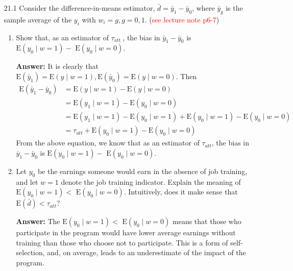 \begin{enumerate}
    \item[21.1] Consider the difference-in-means estimator, $\bar{d}=\bar{y}_{1}-\bar{y}_{0}$, where $\bar{y}_{g}$ is the sample average of the $y_{i}$ with $w_{i}=g, g=0,1$. (\textcolor{red}{see lecture note p6-7})
    \begin{enumerate}
        \item Show that, as an estimator of $\tau_{\text {att }}$, the bias in $\bar{y}_{1}-\bar{y}_{0}$ is $\mathrm{E}\left(y_{0} \mid w=1\right)-$ $\mathrm{E}\left(y_{0} \mid w=0\right)$.
        
        \textbf{Answer:} It is clearly that $\mathrm{E}(\bar{y}_1) = \mathrm{E}(y \mid w=1), \mathrm{E}(\bar{y}_0) = \mathrm{E}(y \mid w=0)$. Then
        \begin{align*}
            \mathrm{E}(\bar{y}_{1}-\bar{y}_{0}) &= \mathrm{E}(y \mid w=1) - \mathrm{E}(y \mid w=0) \\
            &= \mathrm{E}(y_1 \mid w=1) - \mathrm{E}(y_0 \mid w=0) \\
            &= \mathrm{E}(y_1 \mid w=1) - \mathrm{E}(y_0 \mid w=1) + \mathrm{E}(y_0 \mid w=1) - \mathrm{E}(y_0 \mid w=0) \\
            &= \tau_{att} + \mathrm{E}(y_0 \mid w=1) - \mathrm{E}(y_0 \mid w=0)
        \end{align*}
        From the above equation, we know that as an estimator of $\tau_{att}$, the bias in $\bar{y}_{1}-\bar{y}_{0}$ is $\mathrm{E}\left(y_{0} \mid w=1\right)-$ $\mathrm{E}\left(y_{0} \mid w=0\right)$.
        
        \item Let $y_{0}$ be the earnings someone would earn in the absence of job training, and let $w=1$ denote the job training indicator. Explain the meaning of $\mathrm{E}\left(y_{0} \mid w=1\right)<$ $\mathrm{E}\left(y_{0} \mid w=0\right)$. Intuitively, does it make sense that $\mathrm{E}(\bar{d})<\tau_{a t t}$?
        
        \textbf{Answer:} The $\mathrm{E}\left(y_{0} \mid w=1\right)<$ $\mathrm{E}\left(y_{0} \mid w=0\right)$ means that those who participate in the program would have lower average earnings without training than those who choose not to participate. This is a form of self-selection, and, on average, leads to an underestimate of the impact of the program.
    \end{enumerate}
    

\end{enumerate}
